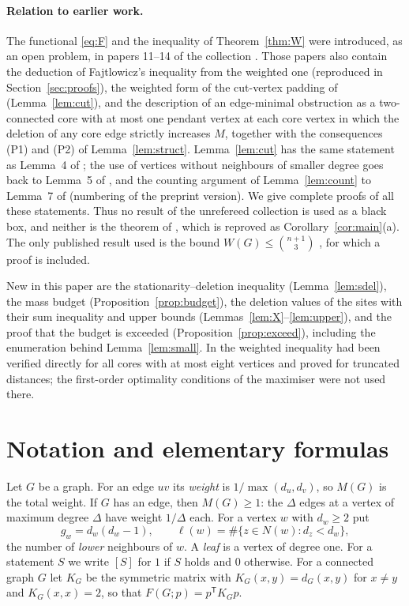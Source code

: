 \documentclass[11pt,a4paper]{article}
\theoremstyle{definition}
\theoremstyle{remark}
\numberwithin{equation}{section}
\begin{document}
\paragraph{Relation to earlier work.}
The functional \eqref{eq:F} and the inequality of Theorem~\ref{thm:W} were
introduced, as an open problem, in papers 11--14 of the collection \cite{VMRC189}.
Those papers also contain the deduction of Fajtlowicz's inequality from the weighted
one (reproduced in Section~\ref{sec:proofs}), the weighted form of the cut-vertex
padding of \cite{DLS} (Lemma~\ref{lem:cut}), and the description of an edge-minimal
obstruction as a two-connected core with at most one pendant vertex at each core
vertex in which the deletion of any core edge strictly increases $M$, together with
the consequences (P1) and (P2) of Lemma~\ref{lem:struct}. Lemma~\ref{lem:cut} has the
same statement as Lemma~4 of \cite{DLS}; the use of vertices without neighbours of
smaller degree goes back to Lemma~5 of \cite{DLS}, and the counting argument of
Lemma~\ref{lem:count} to Lemma~7 of \cite{DLS} (numbering of the preprint version).
We give complete proofs of all these statements. Thus no result of the unrefereed
collection \cite{VMRC189} is used as a black box, and neither is the theorem of
\cite{DLS}, which is reproved as Corollary~\ref{cor:main}(a). The only published
result used is the bound $W(G)\le\binom{n+1}3$ \cite{EJS}, for which a proof is
included.

New in this paper are the stationarity--deletion inequality
(Lemma~\ref{lem:sdel}), the mass budget (Proposition~\ref{prop:budget}), the
deletion values of the sites with their sum inequality and upper bounds
(Lemmas~\ref{lem:X}--\ref{lem:upper}), and the proof that the budget is exceeded
(Proposition~\ref{prop:exceed}), including the enumeration behind
Lemma~\ref{lem:small}. In \cite{VMRC189} the weighted inequality had been verified
directly for all cores with at most eight vertices and proved for truncated
distances; the first-order optimality conditions of the maximiser were not used
there.

\section{Notation and elementary formulas}\label{sec:prelim}

Let $G$ be a graph. For an edge $uv$ its \emph{weight} is $1/\max(d_u,d_v)$, so
$M(G)$ is the total weight. If $G$ has an edge, then $M(G)\ge1$: the $\Delta$ edges
at a vertex of maximum degree $\Delta$ have weight $1/\Delta$ each. For a vertex $w$
with $d_w\ge2$ put
\[
 g_w=d_w(d_w-1),\qquad \ell(w)=\#\{z\in N(w):d_z<d_w\},
\]
the number of \emph{lower} neighbours of $w$. A \emph{leaf} is a vertex of degree
one. For a statement $S$ we write $[S]$ for $1$ if $S$ holds and $0$ otherwise.
For a connected graph $G$ let $K_G$ be the symmetric matrix with $K_G(x,y)=d_G(x,y)$
for $x\ne y$ and $K_G(x,x)=2$, so that $F(G;p)=p^{\mathsf T}K_Gp$.
\end{document}
